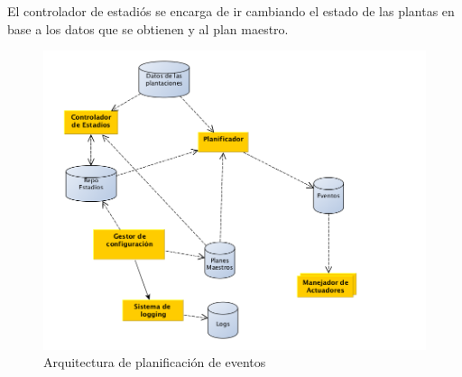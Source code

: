 El controlador de estadi\'os se encarga de ir cambiando el estado de las plantas en base a los datos que se obtienen y al plan maestro.

\begin{figure}[h!]
  \centering
  \includegraphics[width=1\textwidth]{./images/arq_plan.png}
  \caption{Arquitectura de planificaci\'on de eventos}
  \label{fig:clases4}
\end{figure}